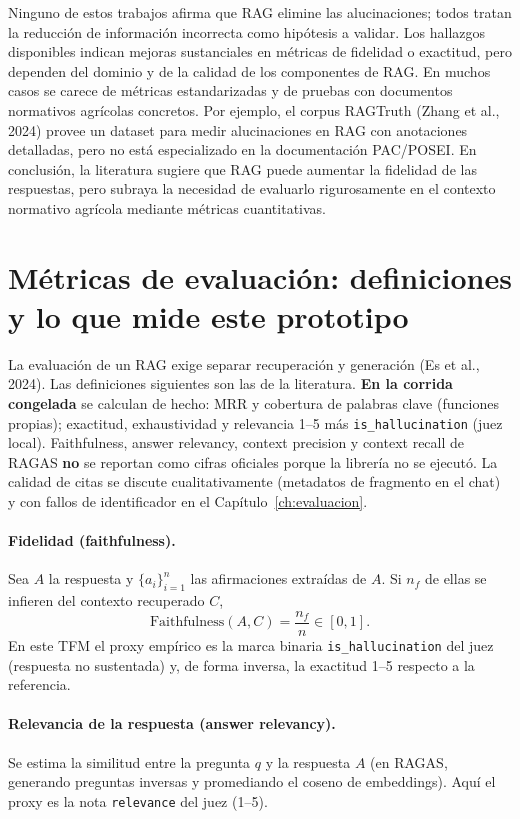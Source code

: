 Ninguno de estos trabajos afirma que RAG elimine las alucinaciones; todos tratan la reducción de información incorrecta como hipótesis a validar. Los hallazgos disponibles indican mejoras sustanciales en métricas de fidelidad o exactitud, pero dependen del dominio y de la calidad de los componentes de RAG. En muchos casos se carece de métricas estandarizadas y de pruebas con documentos normativos agrícolas concretos. Por ejemplo, el corpus RAGTruth (Zhang et al., 2024) provee un dataset para medir alucinaciones en RAG con anotaciones detalladas, pero no está especializado en la documentación PAC/POSEI. En conclusión, la literatura sugiere que RAG puede aumentar la fidelidad de las respuestas, pero subraya la necesidad de evaluarlo rigurosamente en el contexto normativo agrícola mediante métricas cuantitativas.

\section{Métricas de evaluación: definiciones y lo que mide este prototipo}
La evaluación de un RAG exige separar recuperación y generación (Es et al., 2024). Las definiciones siguientes son las de la literatura. \textbf{En la corrida congelada} se calculan de hecho: MRR y cobertura de palabras clave (funciones propias); exactitud, exhaustividad y relevancia 1--5 más \texttt{is\_hallucination} (juez local). Faithfulness, answer relevancy, context precision y context recall de RAGAS \textbf{no} se reportan como cifras oficiales porque la librería no se ejecutó. La calidad de citas se discute cualitativamente (metadatos de fragmento en el chat) y con fallos de identificador en el Capítulo~\ref{ch:evaluacion}.

\paragraph{Fidelidad (faithfulness).}
Sea $A$ la respuesta y $\{a_i\}_{i=1}^{n}$ las afirmaciones extraídas de $A$. Si $n_f$ de ellas se infieren del contexto recuperado $C$,
\begin{equation}
\mathrm{Faithfulness}(A,C)=\frac{n_f}{n}\in[0,1].
\end{equation}
En este TFM el proxy empírico es la marca binaria \texttt{is\_hallucination} del juez (respuesta no sustentada) y, de forma inversa, la exactitud 1--5 respecto a la referencia.

\paragraph{Relevancia de la respuesta (answer relevancy).}
Se estima la similitud entre la pregunta $q$ y la respuesta $A$ (en RAGAS, generando preguntas inversas y promediando el coseno de embeddings). Aquí el proxy es la nota \texttt{relevance} del juez (1--5).

